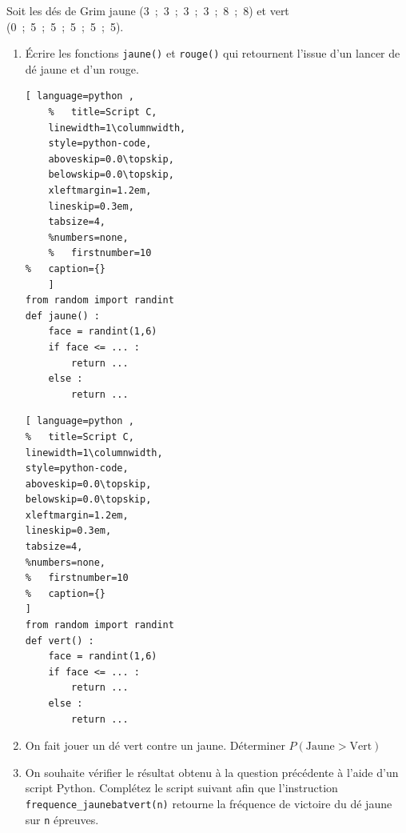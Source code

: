 \documentclass[main.tex]{subfiles}
\begin{document}
\newpage 
\begin{exercise}   
	Soit les dés de Grim jaune  (3~;~3~;~3~;~3~;~8~;~8)   
et vert (0~;~5~;~5~;~5~;~5~;~5). 
\begin{enumerate}[label=\arabic*),leftmargin=*]
	\item Écrire les fonctions \lstinline|jaune()| et \lstinline|rouge()| qui retournent l'issue d'un lancer de dé jaune et d'un rouge. \\
\noindent
\begin{minipage}{0.48\linewidth} 
\begin{lstlisting}[ language=python , 
	%	title=Script C,   
	linewidth=1\columnwidth,
	style=python-code,    
	aboveskip=0.0\topskip,
	belowskip=0.0\topskip,
	xleftmargin=1.2em,
	lineskip=0.3em,
	tabsize=4, 
	%numbers=none,
	%	firstnumber=10  
%	caption={}
	] 
from random import randint 
def jaune() :	
	face = randint(1,6)
	if face <= ... :
		return ...
	else :
		return ...
\end{lstlisting} 
\end{minipage}
\hfill 
\begin{minipage}{0.48\linewidth}
\begin{lstlisting}[ language=python , 
%	title=Script C,   
linewidth=1\columnwidth,
style=python-code,    
aboveskip=0.0\topskip,
belowskip=0.0\topskip,
xleftmargin=1.2em,
lineskip=0.3em,
tabsize=4, 
%numbers=none,
%	firstnumber=10  
%	caption={}
] 
from random import randint 
def vert() :	
	face = randint(1,6)
	if face <= ... :
		return ...
	else :
		return ...
\end{lstlisting} 
\end{minipage}
\item On fait jouer un dé vert contre un jaune. Déterminer $P(\text{Jaune}>\text{Vert})$ %
\item On souhaite vérifier le résultat obtenu à la question précédente à l'aide d'un script Python. Complétez le script suivant afin que l'instruction \lstinline|frequence_jaunebatvert(n)| retourne la fréquence de victoire du dé jaune sur \lstinline|n| épreuves.


\end{enumerate}
\end{exercise}
\end{document}
